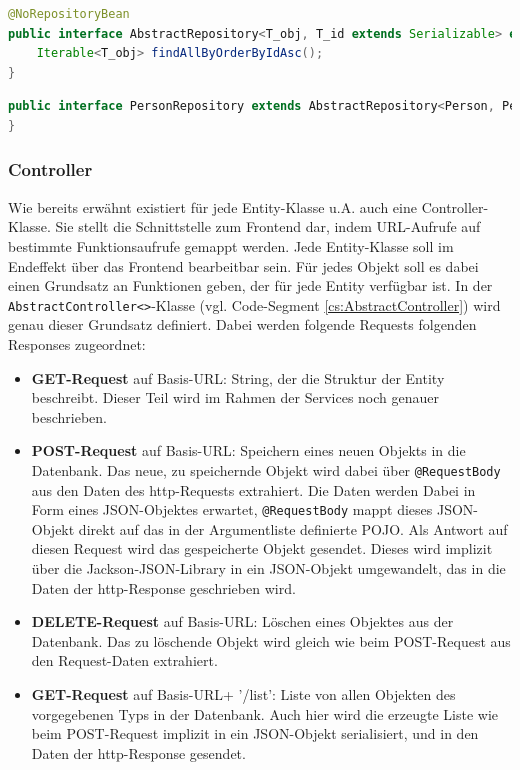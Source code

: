 \scriptsize
\begin{lstlisting}[caption=AbstractRepository.java, label=cs:AbstractRepository, language=Java]
@NoRepositoryBean
public interface AbstractRepository<T_obj, T_id extends Serializable> extends CrudRepository<T_obj, T_id> {
	Iterable<T_obj> findAllByOrderByIdAsc();
}
\end{lstlisting}

\begin{lstlisting}[caption=PersonRepository.java, label=cs:PersonRepository, language=Java]
public interface PersonRepository extends AbstractRepository<Person, PersonId> {
}
\end{lstlisting}
\normalsize

\subsubsection{Controller}

Wie bereits erwähnt existiert für jede Entity-Klasse u.A. auch eine Controller-Klasse. Sie stellt die Schnittstelle zum Frontend dar, indem URL-Aufrufe auf bestimmte Funktionsaufrufe gemappt werden. Jede Entity-Klasse soll im Endeffekt über das Frontend bearbeitbar sein. Für jedes Objekt soll es dabei einen Grundsatz an Funktionen geben, der für jede Entity verfügbar ist. In der \verb|AbstractController<>|-Klasse (vgl. Code-Segment \ref{cs:AbstractController}) wird genau dieser Grundsatz definiert. Dabei werden folgende Requests folgenden Responses zugeordnet:

\begin{itemize}
	\item \textbf{GET-Request}  auf Basis-URL: String, der die Struktur der Entity beschreibt. Dieser Teil wird im Rahmen der Services noch genauer beschrieben.
	\item \textbf{POST-Request}  auf Basis-URL: Speichern eines neuen Objekts in die Datenbank. Das neue, zu speichernde Objekt wird dabei über \verb|@RequestBody| aus den Daten des http-Requests extrahiert. Die Daten werden Dabei in Form eines JSON-Objektes erwartet, \verb|@RequestBody| mappt dieses JSON-Objekt direkt auf das in der Argumentliste definierte POJO. Als Antwort auf diesen Request wird das gespeicherte Objekt gesendet. Dieses wird implizit über die Jackson-JSON-Library in ein JSON-Objekt umgewandelt, das in die Daten der http-Response geschrieben wird.
	\item \textbf{DELETE-Request}  auf Basis-URL: Löschen eines Objektes aus der Datenbank. Das zu löschende Objekt wird gleich wie beim POST-Request aus den Request-Daten extrahiert.
	\item \textbf{GET-Request}  auf Basis-URL+ '/list': Liste von allen Objekten des vorgegebenen Typs in der Datenbank. Auch hier wird die erzeugte Liste wie beim POST-Request implizit in ein JSON-Objekt serialisiert, und in den Daten der http-Response gesendet.
\end{itemize}

